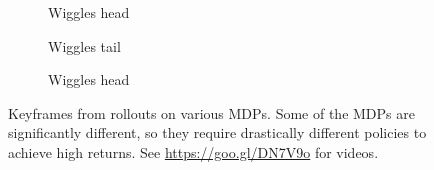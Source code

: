 \documentclass{article}
\begin{document}
\begin{figure}[t!]
\begin{centering}
\begin{subfigure}[b]{0.3\columnwidth}
\caption{Wiggles head}
\end{subfigure}
\hfill
\begin{subfigure}[b]{0.3\columnwidth}
\caption{Wiggles tail}
\end{subfigure}
\hfill
\begin{subfigure}[b]{0.3\columnwidth}
\caption{Wiggles head}
\end{subfigure}
\end{centering}
\caption{Keyframes from rollouts on various MDPs. Some of the MDPs are significantly different, so they require drastically different policies to achieve high returns. See \url{https://goo.gl/DN7V9o} for videos.}
\label{fig:frames}
\end{figure}


\end{document}
